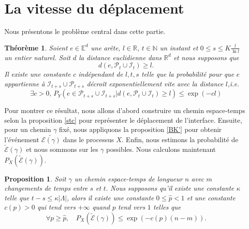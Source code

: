 \documentclass[titlepage,a4paper,12pt]{article}
\newcounter{th}
\newcounter{propo}
\newtheorem{thm}[th]{Théorème}
\newtheorem{prop}[propo]{Proposition}
\begin{document}
\section{La vitesse du déplacement}
Nous présentons le problème central dans cette partie. 
\begin{thm}\label{vitesse}
Soient $e\in \mathbb{E}^d$ une arête, $l\in \mathbb{R}$, $t\in \mathbb{N}$ un instant et $\displaystyle 0\leqslant s\leqslant K\frac{l}{\ln l}$ un entier naturel. Soit $d$ la distance euclidienne dans $\mathbb{R}^d$ et nous supposons que $$d(e,\mathcal{P}_t\cup \mathcal{I}_t) \geqslant l.$$ Il existe une constante $c$ indépendant de $l,t,s$ telle que la probabilité pour que $e$ appartienne à $\mathcal{I}_{t+s}\cup \mathcal{P}_{t+s}$ décroît exponentiellement vite avec la distance $l$,i.e. 
\begin{equation}
\exists c > 0,\, P_Y(e\in \mathcal{P}_{t+s}\cup \mathcal{I}_{t+s}|d(e,\mathcal{P}_t\cup \mathcal{I}_t) \geqslant l)\leqslant \exp(-cl)
\end{equation}
\end{thm}
Pour montrer ce résultat, nous allons d'abord construire un chemin espace-temps selon la proposition \ref{stc} pour représenter le déplacement de l'interface. Ensuite, pour un chemin $\gamma$ fixé, nous appliquons la proposition \ref{BK'} pour obtenir l'événement $\tilde{\mathcal{E}(\gamma)}$ dans le processus $X$. Enfin, nous estimons la probabilité de $\tilde{\mathcal{E}}(\gamma)$ et nous sommons sur les $\gamma$ possibles. Nous calculons maintenant $P_X(\tilde{\mathcal{E}}(\gamma))$.
\begin{prop} \label{decexp}
Soit $\gamma$ un chemin espace-temps de longueur $n$ avec $m$ changements de temps entre $s$ et $t$. Nous supposons qu'il existe une constante $\kappa$ telle que $t-s \leqslant \kappa |\Lambda|$, alors il existe une constante $0\leqslant\hat{p}< 1$ et une constante $c(p)>0$ qui tend vers $+\infty$ quand $p$ tend vers $1$ telles que $$\forall p \geqslant \hat{p}, \quad P_X(\tilde{\mathcal{E}}(\gamma))\leqslant \exp(-c(p)(n-m)).$$
\end{prop}
\end{document}
